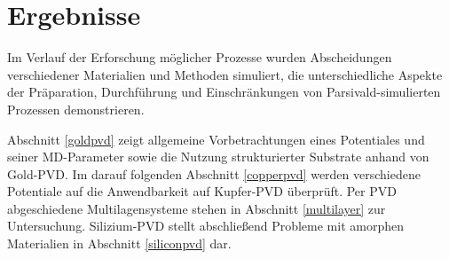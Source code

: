 \cleardoublepage
\chapter{Ergebnisse}

Im Verlauf der Erforschung möglicher Prozesse wurden Abscheidungen verschiedener Materialien und Methoden simuliert, die unterschiedliche Aspekte der Präparation, Durchführung und Einschränkungen von Parsivald-simulierten Prozessen demonstrieren.

Abschnitt \ref{goldpvd} zeigt allgemeine Vorbetrachtungen eines Potentiales und seiner MD-Parameter sowie die Nutzung strukturierter Substrate anhand von Gold-PVD.
Im darauf folgenden Abschnitt \ref{copperpvd} werden verschiedene Potentiale auf die Anwendbarkeit auf Kupfer-PVD überprüft.
Per PVD abgeschiedene Multilagensysteme stehen in Abschnitt \ref{multilayer} zur Untersuchung.
Silizium-PVD stellt abschließend Probleme mit amorphen Materialien in Abschnitt \ref{siliconpvd} dar.


\clearpage

\clearpage

\clearpage

\clearpage

